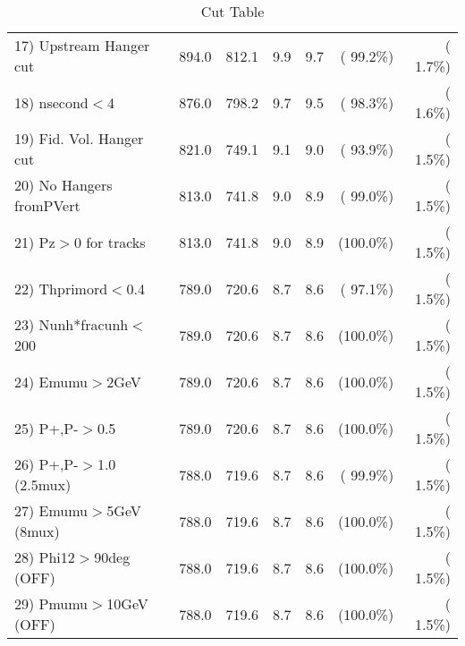 \begin{table}[h!]
\begin{tabular}{||l||r|r|r|r|r|r||}
 17) Upstream Hanger cut  &        894.0 &        812.1 &          9.9 &          9.7 & ( 99.2\%) & (  1.7\%) \\
 18) nsecond$<$4          &        876.0 &        798.2 &          9.7 &          9.5 & ( 98.3\%) & (  1.6\%) \\
 19) Fid. Vol. Hanger cut &        821.0 &        749.1 &          9.1 &          9.0 & ( 93.9\%) & (  1.5\%) \\
 20) No Hangers fromPVert &        813.0 &        741.8 &          9.0 &          8.9 & ( 99.0\%) & (  1.5\%) \\
 21) Pz$>$0 for tracks    &        813.0 &        741.8 &          9.0 &          8.9 & (100.0\%) & (  1.5\%) \\
 22) Thprimord$<$0.4      &        789.0 &        720.6 &          8.7 &          8.6 & ( 97.1\%) & (  1.5\%) \\
 23) Nunh*fracunh$<$200   &        789.0 &        720.6 &          8.7 &          8.6 & (100.0\%) & (  1.5\%) \\
 24) Emumu$>$2GeV         &        789.0 &        720.6 &          8.7 &          8.6 & (100.0\%) & (  1.5\%) \\
 25) P+,P-$>$0.5          &        789.0 &        720.6 &          8.7 &          8.6 & (100.0\%) & (  1.5\%) \\
 26) P+,P-$>$1.0 (2.5mux) &        788.0 &        719.6 &          8.7 &          8.6 & ( 99.9\%) & (  1.5\%) \\
 27) Emumu$>$5GeV  (8mux) &        788.0 &        719.6 &          8.7 &          8.6 & (100.0\%) & (  1.5\%) \\
 28) Phi12$>$90deg  (OFF) &        788.0 &        719.6 &          8.7 &          8.6 & (100.0\%) & (  1.5\%) \\
 29) Pmumu$>$10GeV  (OFF) &        788.0 &        719.6 &          8.7 &          8.6 & (100.0\%) & (  1.5\%) \\
 \hline
 \hline
 \end{tabular}
 \caption{Cut Table           }
 \label{tab-cutcohjpsi-mumu_cohpip}
 \end{table}
